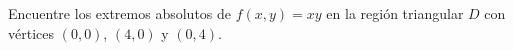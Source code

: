 Encuentre los extremos absolutos de $f(x, y) = xy$ en la región triangular $D$ con vértices $(0, 0)$, $(4, 0)$ y $(0, 4)$.
